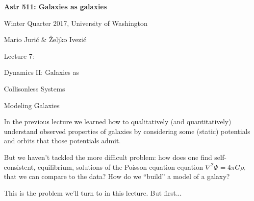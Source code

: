 \documentclass[letterpaper,landscape]{slides}
\begin{document}
\newcommand{\Spicslide}[7]{%
  \begin{slide}
     \begin{center}
        \begin{minipage}{#5in}
            \vskip #6in
            \hskip #7in
            {\scalebox{#4}{\texttt{[image: \#1.\#2]}}}
        \end{minipage}
     \end{center}
     \vfill
  \end{slide}
}
 




\begin{slide}

\phantom{x}
\vskip -2in
\begin{center}
\bfseries
{\large {\color{blue} Astr 511: Galaxies as galaxies}}
\end{center}

{\centerline {{\color{blue} 
Winter Quarter 2017, University of Washington}}}
{\centerline {{\color{blue} 
Mario Juri\'{c} \& \v{Z}eljko Ivezi\'{c} }}}

\vskip 1.6in

{\centerline {\Large {\color{red}      Lecture 7:             }}}
\vskip 0.2in 
{\centerline {\huge {\color{blue} Dynamics II: Galaxies as }}}
\vskip 0.1in
{\centerline {\huge {\color{blue} Collisonless Systems }}}

\vfill
\end{slide}

\begin{slide}
\begin{center}
{\large \color{red} Modeling Galaxies }
\end{center}

In the previous lecture we learned how to qualitatively (and quantitatively)
understand observed properties of galaxies by considering some (static)
potentials and orbits that those potentials admit.

But we haven't tackled the more difficult problem: how does one find
self-consistent, equilibrium, solutions of the Poisson equation equation
$\nabla^2 \Phi = 4 \pi G \rho$, that we can compare to the data? How do we
``build'' a model of a galaxy?

This is the problem we'll turn to in this lecture. But first...

\vfill
\end{slide}
\end{document}
